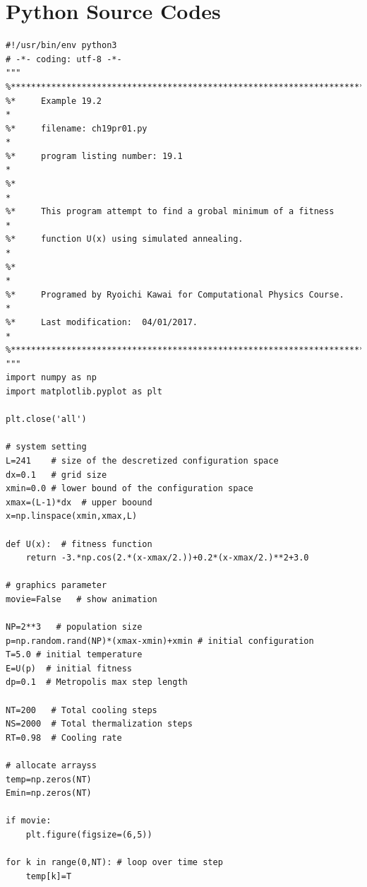 
\bigskip
\noindent
\section*{Python Source Codes}
\setcounter{program}{0}

\bigskip
\noindent
\program
\footnotesize
\begin{verbatim}
#!/usr/bin/env python3
# -*- coding: utf-8 -*-
"""
%**************************************************************************
%*     Example 19.2                                                       *
%*     filename: ch19pr01.py                                              *
%*     program listing number: 19.1                                       *
%*                                                                        *
%*     This program attempt to find a grobal minimum of a fitness         *
%*     function U(x) using simulated annealing.                                         *
%*                                                                        *
%*     Programed by Ryoichi Kawai for Computational Physics Course.       *
%*     Last modification:  04/01/2017.                                    *
%**************************************************************************
"""
import numpy as np
import matplotlib.pyplot as plt

plt.close('all')

# system setting
L=241    # size of the descretized configuration space
dx=0.1   # grid size
xmin=0.0 # lower bound of the configuration space
xmax=(L-1)*dx  # upper boound
x=np.linspace(xmin,xmax,L)

def U(x):  # fitness function
    return -3.*np.cos(2.*(x-xmax/2.))+0.2*(x-xmax/2.)**2+3.0

# graphics parameter
movie=False   # show animation

NP=2**3   # population size
p=np.random.rand(NP)*(xmax-xmin)+xmin # initial configuration
T=5.0 # initial temperature
E=U(p)  # initial fitness
dp=0.1  # Metropolis max step length

NT=200   # Total cooling steps
NS=2000  # Total thermalization steps
RT=0.98  # Cooling rate

# allocate arrayss
temp=np.zeros(NT)
Emin=np.zeros(NT)

if movie:
    plt.figure(figsize=(6,5))
    
for k in range(0,NT): # loop over time step
    temp[k]=T


\end{verbatim}
